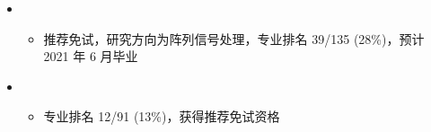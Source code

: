   \begin{itemize}[leftmargin=*]
    \item
      {\small
      \begin{itemize}
        \item{推荐免试，研究方向为阵列信号处理，专业排名 39/135 (28\%)，预计 2021 年 6 月毕业}
      \end{itemize}
      }
    \item
      {\small
      \begin{itemize}
        \item{专业排名 12/91 (13\%)，获得推荐免试资格}
      \end{itemize}
      }
  \end{itemize}